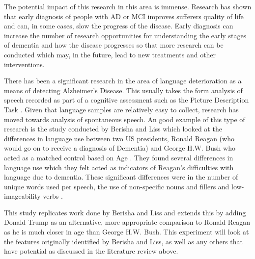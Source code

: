 \documentclass[10pt]{article}
\begin{document}
\par
The potential impact of this research in this area is immense. Research has shown that early diagnosis of people with AD or MCI improves sufferers quality of life and can, in some cases, slow the progress of the disease. Early diagnosis can increase the number of research opportunities for understanding the early stages of dementia and how the disease progresses so that more research can be conducted which may, in the future, lead to new treatments and other interventions.
\par 
There has been a significant research in the area of language deterioration as a means of detecting Alzheimer's Disease. This usually takes the form analysis of speech recorded as part of a cognitive assessment such as the Picture Description Task \cite{Orimaye2014,Fraser2015}. Given that language samples are relatively easy to collect, research has moved towards analysis of spontaneous speech. An good example of this type of research is the study conducted by Berisha and Liss which looked at the differences in language use between two US presidents, Ronald Reagan (who would go on to receive a diagnosis of Dementia) and George H.W. Bush who acted as a matched control based on Age \cite{Berisha2015}. They found several differences in language use which they felt acted as indicators of Reagan's difficulties with language due to dementia. These significant differences were in the number of unique words used per speech, the use of non-specific nouns and fillers and low-imageability verbs \cite{Berisha2015}. 
\par   
This study replicates work done by Berisha and Liss and extends this by adding Donald Trump as an alternative, more appropriate comparison to Ronald Reagan as he is much closer in age than George H.W. Bush. This experiment will look at the features originally identified by Berisha and Liss, as well as any others that have potential as discussed in the literature review above. 
\end{document}
